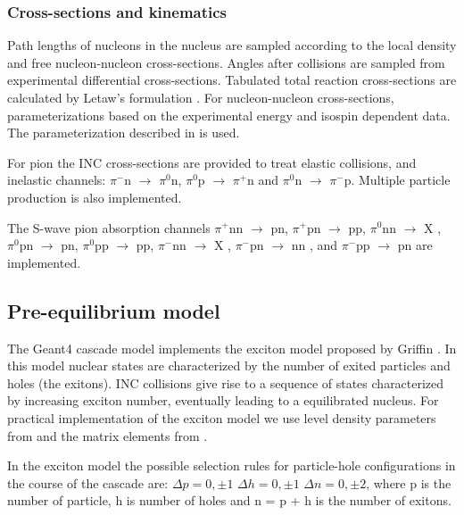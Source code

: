 \documentclass[twocolumn,twoside,slac,floatfix]{revtex4}
\begin{document}
\subsubsection{Cross-sections and kinematics}

Path lengths of nucleons in the nucleus are sampled according to the local density and free nucleon-nucleon cross-sections.
Angles after collisions are sampled from experimental differential cross-sections.
Tabulated total reaction cross-sections are calculated by Letaw's formulation \cite{letaw83, letaw93, pearlstein89}.
For nucleon-nucleon cross-sections, parameterizations based on the experimental energy and isospin dependent data. 
The parameterization described in \cite{barashenkov72} is used. 

For pion the INC cross-sections are provided to treat elastic collisions, and inelastic channels:
$\pi^{-}$n $\rightarrow$ $\pi^{0}$n, $\pi^{0}$p $\rightarrow$ $\pi^{+}$n and $\pi^{0}$n $\rightarrow$ $\pi^{-}$p.
Multiple particle production is also implemented.

The S-wave pion absorption channels 
$\pi^{+}$nn $\rightarrow$ pn, $\pi^{+}$pn $\rightarrow$ pp, 
$\pi^{0}$nn $\rightarrow$ X , $\pi^{0}$pn $\rightarrow$ pn,      $\pi^{0}$pp $\rightarrow$ pp, 
$\pi^{-}$nn $\rightarrow$ X , $\pi^{-}$pn $\rightarrow$ nn , and $\pi^{-}$pp $\rightarrow$ pn are implemented.


\subsection{Pre-equilibrium model}

The Geant4 cascade model implements the exciton model proposed by Griffin \cite{griffin66}.
In this model nuclear states are characterized by the number of exited particles and holes (the exitons).
INC collisions give rise to a sequence of states characterized by increasing exciton number, eventually leading to a equilibrated nucleus.
For practical implementation of the exciton model we use level density parameters from \cite{ribansky73} and the matrix elements from \cite{kalbach78}.

In the exciton model the possible selection rules for particle-hole configurations in the course of the cascade are:
$\Delta p = 0, \pm 1$  $\Delta h = 0, \pm 1$  $\Delta n = 0, \pm 2$,
where p is the number of particle, h is number of holes and n = p + h is the number of exitons. 
\end{document}
